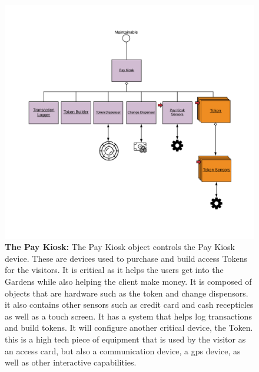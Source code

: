 \documentclass[12pt]{article}
\begin{document}
\begin{figure}[H]
    \centerline{\includegraphics[scale=.20]{PayKiosk.png}}
    \caption{\textbf{The Pay Kiosk: }The Pay Kiosk object controls the Pay Kiosk device. These are devices used to 
purchase and build access Tokens for the visitors. It is critical as it helps the users get into 
the Gardens while also helping the client make money. It is composed of objects that are hardware such
 as the token and change dispensors. it also contains other sensors such as credit card and cash 
 recepticles as well as a touch screen. It has a system that helps log transactions and build tokens. 
 It will configure another critical device, the Token. this is a high tech piece of equipment that is 
 used by the visitor as an access card, but also a communication device, a gps device, as well as 
 other interactive capabilities.}
    \label{fig:PayKiosk}
\end{figure} 
\end{document}
